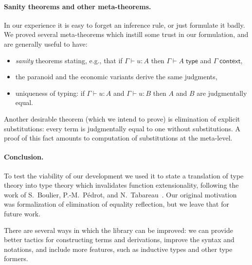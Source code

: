 \documentclass{easychair}
\newcommand{\ctx}{\Gamma}
\newcommand{\isctx}{\ctx\;\mathsf{context}}
\newcommand{\istype}[1]{\ctx \vdash #1 \;\mathsf{type}}
\newcommand{\isterm}[2]{\ctx \vdash #1 : #2}
\begin{document}
\paragraph*{Sanity theorems and other meta-theorems.}
\label{sec:sanity-theorems}

In our experience it is easy to forget an inference rule, or just formulate it badly. We
proved several meta-theorems which instill some trust in our formulation, and are
generally useful to have:
%
\begin{itemize} \itemsep0em
\item \emph{sanity} theorems stating, e.g., that if $\isterm{u}{A}$ then $\istype{A}$ and $\isctx$,
\item the paranoid and the economic variants derive the same judgments,
\item uniqueness of typing: if $\isterm{u}{A}$ and $\isterm{u}{B}$ then $A$ and $B$ are
  judgmentally equal.
\end{itemize}
%
Another desirable theorem (which we intend to prove) is elimination of explicit
substitutions: every term is judgmentally equal to one without substitutions. A proof of
this fact amounts to computation of substitutions at the meta-level.



\paragraph*{Conclusion.}

To test the viability of our development we used it to state a translation of type theory
into type theory which invalidates function extensionality, following the work of
S.~Boulier, P.-M.~Pédrot, and N.~Tabareau~\cite{boulier17:_next_syntac_model_type_theor}.
Our original motivation was formalization of elimination of equality reflection, but we
leave that for future work.

There are several ways in which the library can be improved: we can provide better tactics
for constructing terms and derivations, improve the syntax and notations, and include more
features, such as inductive types and other type formers.





\end{document}
